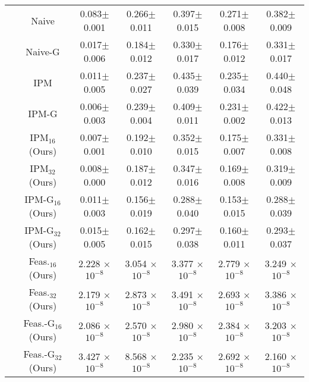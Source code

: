 \begin{table*}[t]
{\begin{tabular}{ccccccc}
{\multirow{12}{*}{Cons. vio.}}
& Naive \citeyear{chen2024qp} & 0.083\scriptsize$\pm$0.001 & 0.266\scriptsize$\pm$0.011 & 0.397\scriptsize$\pm$0.015
& 0.271\scriptsize$\pm$0.008 & 0.382\scriptsize$\pm$0.009  \\
& Naive-G \citeyear{chen2024qp} & 0.017\scriptsize$\pm$0.006 & 0.184\scriptsize$\pm$0.012 & 0.330\scriptsize$\pm$0.017
& 0.176\scriptsize$\pm$0.012 & 0.331\scriptsize$\pm$0.017 \\
\cmidrule{2-7}
& IPM \citeyear{pmlr-v238-qian24a} & 0.011\scriptsize$\pm$0.005 & 0.237\scriptsize$\pm$0.027 & 0.435\scriptsize$\pm$0.039
& 0.235\scriptsize$\pm$0.034 & 0.440\scriptsize$\pm$0.048 \\
& IPM-G \citeyear{pmlr-v238-qian24a} & 0.006\scriptsize$\pm$0.003 & 0.239\scriptsize$\pm$0.004 & 0.409\scriptsize$\pm$0.011
& 0.231\scriptsize$\pm$0.002 & 0.422\scriptsize$\pm$0.013 \\
\cmidrule{2-7}
& IPM$_{16}$ (Ours) & 0.007\scriptsize$\pm$0.001 & 0.192\scriptsize$\pm$0.010 & 0.352\scriptsize$\pm$0.015
& 0.175\scriptsize$\pm$0.007 & 0.331\scriptsize$\pm$0.008\\
& IPM$_{32}$ (Ours) & 0.008\scriptsize$\pm$0.000 & 0.187\scriptsize$\pm$0.012 & 0.347\scriptsize$\pm$0.016
& 0.169\scriptsize$\pm$0.008 & 0.319\scriptsize$\pm$0.009\\
& IPM-G$_{16}$ (Ours) & 0.011\scriptsize$\pm$0.003 & 0.156\scriptsize$\pm$0.019 & 0.288\scriptsize$\pm$0.040
& 0.153\scriptsize$\pm$0.015 & 0.288\scriptsize$\pm$0.039 \\
& IPM-G$_{32}$ (Ours) & 0.015\scriptsize$\pm$0.005 & 0.162\scriptsize$\pm$0.015 & 0.297\scriptsize$\pm$0.038
& 0.160\scriptsize$\pm$0.011 & 0.293\scriptsize$\pm$0.037 \\
\cmidrule{2-7}
& Feas.$_{16}$ (Ours) & 2.228 \(\times\) \(10^{-8}\) & 3.054 \(\times\) \(10^{-8}\) & 3.377 \(\times\) \(10^{-8}\)
& 2.779 \(\times\) \(10^{-8}\) & 3.249 \(\times\) \(10^{-8}\) \\
& Feas.$_{32}$ (Ours) & 2.179 \(\times\) \(10^{-8}\) & 2.873 \(\times\) \(10^{-8}\) & 3.491 \(\times\) \(10^{-8}\)
& 2.693 \(\times\) \(10^{-8}\) & 3.386 \(\times\) \(10^{-8}\) \\
& Feas.-G$_{16}$ (Ours) & 2.086 \(\times\) \(10^{-8}\) & 2.570 \(\times\) \(10^{-8}\) & 2.980 \(\times\) \(10^{-8}\)
& 2.384 \(\times\) \(10^{-8}\) & 3.203 \(\times\) \(10^{-8}\) \\
& Feas.-G$_{32}$ (Ours) & 3.427 \(\times\) \(10^{-8}\) & 8.568 \(\times\) \(10^{-8}\) & 2.235 \(\times\) \(10^{-8}\)
& 2.692 \(\times\) \(10^{-8}\) & 2.160 \(\times\) \(10^{-8}\) \\

\bottomrule

\end{tabular}
}
\end{table*}


 




